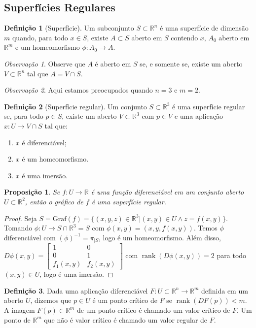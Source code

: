 \documentclass{article}
\theoremstyle{plain}
\newtheorem{prop}{Proposição}[section]
\theoremstyle{definition}
\newtheorem{definicao}{Definição}[section]
\theoremstyle{remark}
\newtheorem{obs}{Observação}[section]
\DeclareMathOperator{\rank}{rank}
\begin{document}
\subsection{Superfícies Regulares}
\begin{definicao}[Superfície]
	Um subconjunto $S\subset \mathbb{R}^n$ é uma superfície de dimensão $m$ quando, para todo $x\in S$, existe $A \subset S$ aberto em $S$ contendo $x$, $A_0$ aberto em $\mathbb{R}^m$ e um homeomorfismo $\phi: A_0 \to A$.
\end{definicao}
\begin{obs}
	Observe que $A$ é aberto em $S$ se, e somente se, existe um aberto $V\subset \mathbb{R}^n$ tal que $A = V\cap S$.
\end{obs}
\begin{obs}
	Aqui estamos preocupados quando $n = 3$ e $m = 2$.
\end{obs}
\begin{definicao}[Superfície regular]
	Um conjunto $S\subset \mathbb{R}^3$ é uma superfície regular se, para todo $p\in S$, existe um aberto $V\subset \mathbb{R}^3$ com $p\in V$ e uma aplicação $x: U \to V\cap S$ tal que:
	\begin{enumerate}
		\item $x$ é diferenciável;
		\item $x$ é um homeomorfismo.
		\item $x$ é uma imersão.
	\end{enumerate}
\end{definicao}

\begin{prop}
	Se $f:U\to \mathbb{R}$ é uma função diferenciável em um conjunto aberto $U\subset \mathbb{R}^2$, então o gráfico de $f$ é uma superfície regular.
\end{prop}

\begin{proof}
	Seja $S = \text{Graf}(f) = \{ (x,y,z) \in \mathbb{R}^3 | (x,y) \in U \land z = f(x,y) \}$. Tomando $\phi: U \to S\cap \mathbb{R}^3 = S$ com $\phi(x,y) = (x,y, f(x,y))$. Temos $\phi$ diferenciável com $(\phi)^{-1} = \pi_{|S}$, logo é um homeomorfismo. Além disso, $D\phi(x,y) = \begin{bmatrix} 1 & 0 \\ 0 & 1 \\ f_1(x,y) & f_2(x,y) \end{bmatrix}$ com $\rank(D\phi(x,y)) = 2$ para todo $(x,y) \in U$, logo é uma imersão.
\end{proof}
\begin{definicao}
	Dada uma aplicação diferenciável $F: U \subset \mathbb{R}^n \to \mathbb{R}^m$ definida em um aberto $U$, dizemos que $p\in U$ é um ponto crítico de $F$ se $\rank(DF(p)) < m$. A imagem $F(p) \in \mathbb{R}^m$ de um ponto crítico é chamado um valor crítico de $F$. Um ponto de $\mathbb{R}^m$ que não é valor crítico é chamado um valor regular de $F$.
\end{definicao}
\end{document}
